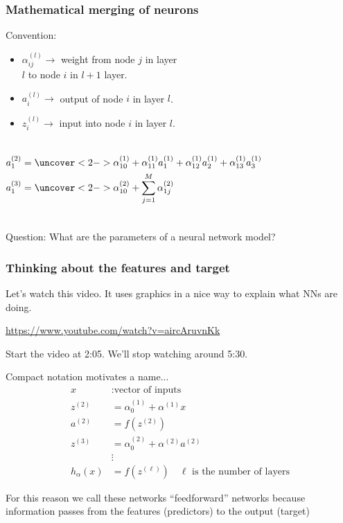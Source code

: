 \documentclass[mathserif, aspectratio=169]{beamer}
\begin{document}
\begin{frame}[t]\frametitle{Mathematical merging of neurons}
    Convention:
    \begin{itemize}
    	\item $\alpha_{ij}^{(l)} \rightarrow$ weight from node $j$ in layer\\ $l$ to node $i$ in $l+1$ layer.
    	\item $a_{i}^{(l)} \rightarrow$ output of node $i$ in layer $l$.
    	\item $z_i^{(l)} \rightarrow$ input into node $i$ in layer $l$.
    \end{itemize}

    \begin{columns}
    	    \begin{align*}
		     	a_1^{(2)} &= \uncover<2->{\alpha_{10}^{(1)} + \alpha_{11}^{(1)}a_1^{(1)}+\alpha_{12}^{(1)}a_2^{(1)}+\alpha_{13}^{(1)}a_3^{(1)}} \\
		     	a_1^{(3)} &= \uncover<2->{\alpha_{10}^{(2)} + \sum_{j=1}^M\alpha_{1j}^{(2)}} \\
		    \end{align*}
    \end{columns}
    
    Question: What are the parameters of a neural network model?

\end{frame}

\begin{frame}[t]\frametitle{Thinking about the features and target}
    Let's watch this video.  It uses graphics in a nice way to explain what NNs are doing. 
    \vspace{10mm}

    \url{https://www.youtube.com/watch?v=aircAruvnKk}

    \vspace{10mm}

    Start the video at 2:05.  We'll stop watching around 5:30.
\end{frame}

\begin{frame}{Compact notation motivates a name...}
	\pause
	\begin{align*}
		x &: \text{vector of inputs}\\
		z^{(2)} & = \alpha_0^{(1)} + \alpha^{(1)}x \\
		a^{(2)} & = f(z^{(2)})\\
		z^{(3)} & = \alpha_0^{(2)} + \alpha^{(2)}a^{(2)} \\
		&\vdots\\
		h_\alpha(x) &= f(z^{(\ell)}) \quad \ell \text{ is the number of layers}
	\end{align*}

	For this reason we call these networks ``feedforward'' networks because information passes from the features (predictors) to the output (target)
\end{frame}
\end{document}
